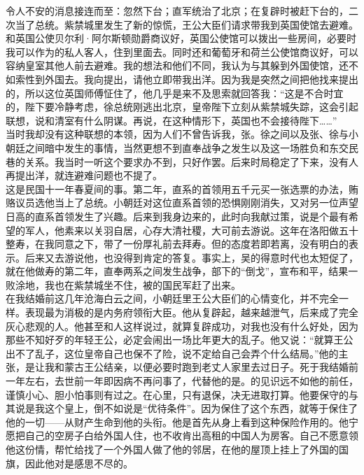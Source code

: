 令人不安的消息接连而至：忽然下台；直军统治了北京；在复辟时被赶下台的，二次当了总统。紫禁城里发生了新的惊慌，王公大臣们请求带我到英国使馆去避难。和英国公使贝尔利·阿尔斯顿勋爵商议好，英国公使馆可以拨出一些房间，必要时我可以作为的私人客人，住到里面去。同时还和葡萄牙和荷兰公使馆商议好，可以容纳皇室其他人前去避难。我的想法和他们不同，我认为与其躲到外国使馆，还不如索性到外国去。我向提出，请他立即带我出洋。因为我是突然之间把他找来提出的，所以这位英国师傅怔住了，他几乎是来不及思索就回答我：“这是不合时宜的，陛下要冷静考虑，徐总统刚逃出北京，皇帝陛下立刻从紫禁城失踪，这会引起联想，说和清室有什么阴谋。再说，在这种情形下，英国也不会接待陛下……”\\

当时我却没有这种联想的本领，因为人们不曾告诉我，张。徐之间以及张、徐与小朝廷之间暗中发生的事情，当然更想不到直奉战争之发生以及这一场胜负和东交民巷的关系。我当时一听这个要求办不到，只好作罢。后来时局稳定了下来，没有人再提出洋，就连避难问题也不提了。\\

这是民国十一年春夏间的事。第二年，直系的首领用五千元买一张选票的办法，贿赂议员选他当上了总统。小朝廷对这位直系首领的恐惧刚刚消失，又对另一位声望日高的直系首领发生了兴趣。后来到我身边来的，此时向我献过策，说是个最有希望的军人，他素来以关羽自居，心存大清社稷，大可前去游说。这年在洛阳做五十整寿，在我同意之下，带了一份厚礼前去拜寿。但的态度若即若离，没有明白的表示。后来又去游说他，也没得到肯定的答复。事实上，吴的得意时代也太短促了，就在他做寿的第二年，直奉两系之间发生战争，部下的“倒戈”，宣布和平，结果一败涂地，我也在紫禁城坐不住，被的国民军赶了出来。\\

在我结婚前这几年沧海白云之间，小朝廷里王公大臣们的心情变化，并不完全一样。表现最为消极的是内务府领衔大臣。他从复辟起，越来越泄气，后来成了完全灰心悲观的人。他甚至和人这样说过，就算复辟成功，对我也没有什么好处，因为那些不知好歹的年轻王公，必定会闹出一场比年更大的乱子。他又说：“就算王公出不了乱子，这位皇帝自己也保不了险，说不定给自己会弄个什么结局。”他的主张，是让我和蒙古王公结亲，以便必要时跑到老丈人家里去过日子。死于我结婚前一年左右，去世前一年即因病不再问事了，代替他的是。的见识远不如他的前任，谨慎小心、胆小怕事则有过之。在心里，只有退保，决无进取打算。他要保守的与其说是我这个皇上，倒不如说是“优待条件”。因为保住了这个东西，就等于保住了他的一切——从财产生命到他的头衔。他是首先从身上看到这种保险作用的。他宁愿把自己的空房子白给外国人住，也不收肯出高租的中国人为房客。自己不愿意领他这份情，帮忙给找了一个外国人做了他的邻居，在他的屋顶上挂上了外国的国旗，因此他对是感思不尽的。\\

